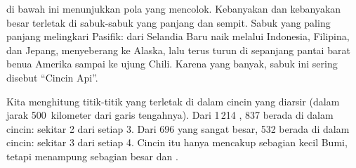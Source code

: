  di bawah ini menunjukkan pola yang mencolok. Kebanyakan  dan
kebanyakan  besar terletak di sabuk-sabuk yang panjang dan
sempit. Sabuk yang paling panjang melingkari  Pasifik: dari Selandia
Baru naik melalui Indonesia, Filipina, dan Jepang, menyeberang ke Alaska,
lalu terus turun di sepanjang pantai barat benua Amerika sampai ke ujung
Chili. Karena  yang banyak, sabuk ini sering disebut
``Cincin Api''.

\begin{example}\label{ex:g4:volcanoes-earthquakes-first-look:shares}
Kita menghitung titik-titik yang terletak di dalam cincin yang diarsir
(dalam jarak 500~kilometer dari garis tengahnya). Dari 1\,214 ,
837 berada di dalam cincin: sekitar 2 dari setiap 3. Dari 696 
yang sangat besar, 532 berada di dalam cincin: sekitar 3 dari setiap 4.
Cincin itu hanya mencakup sebagian kecil Bumi, tetapi menampung sebagian
besar  dan .
\end{example}

